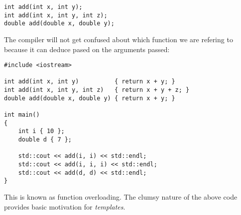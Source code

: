 \begin{lstlisting}[style=cxx]
int add(int x, int y);
int add(int x, int y, int z);
double add(double x, double y);
\end{lstlisting}

\noindent
The compiler will not get confused about which function we are refering to because it can deduce pased on the arguments passed:

\begin{lstlisting}[style=cxx]
#include <iostream>

int add(int x, int y)          { return x + y; }
int add(int x, int y, int z)   { return x + y + z; }
double add(double x, double y) { return x + y; }

int main()
{
    int i { 10 };
    double d { 7 };

    std::cout << add(i, i) << std::endl;
    std::cout << add(i, i, i) << std::endl;
    std::cout << add(d, d) << std::endl;
}
\end{lstlisting}

\noindent
This is known as function overloading. The clumsy nature of the above code provides basic motivation for \textit{templates}.
